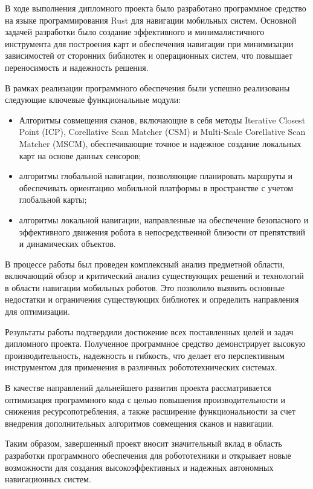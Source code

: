 \label{sec:ending}

В ходе выполнения дипломного проекта было разработано программное средство на
языке программирования Rust для навигации мобильных систем. Основной задачей
разработки было создание эффективного и минималистичного инструмента для
построения карт и обеспечения навигации при минимизации зависимостей от
сторонних библиотек и операционных систем, что повышает переносимость и
надежность решения.

В рамках реализации программного обеспечения были успешно реализованы следующие
ключевые функциональные модули:

\begin{itemize}
	\item Алгоритмы совмещения сканов, включающие в себя методы Iterative
		Closest Point (ICP), Corellative Scan Matcher (CSM) и Multi-Scale
		Corellative Scan Matcher (MSCM), обеспечивающие точное и надежное
		создание локальных карт на основе данных сенсоров;
	\item алгоритмы глобальной навигации, позволяющие планировать маршруты и
		обеспечивать ориентацию мобильной платформы в пространстве с учетом
		глобальной карты;
	\item алгоритмы локальной навигации, направленные на обеспечение
		безопасного и эффективного движения робота в непосредственной близости
		от препятствий и динамических объектов.
\end{itemize}


В процессе работы был проведен комплексный анализ предметной области,
включающий обзор и критический анализ существующих решений и технологий в
области навигации мобильных роботов. Это позволило выявить
основные недостатки и ограничения существующих библиотек и определить
направления для оптимизации.

Результаты работы подтвердили достижение всех поставленных целей и задач
дипломного проекта. Полученное программное средство демонстрирует высокую
производительность, надежность и гибкость, что делает его перспективным
инструментом для применения в различных робототехнических системах.

В качестве направлений дальнейшего развития проекта рассматривается оптимизация
программного кода с целью повышения производительности и снижения
ресурсопотребления, а также расширение функциональности за счет внедрения
дополнительных алгоритмов совмещения сканов и навигации.

Таким образом, завершенный проект вносит значительный вклад в область
разработки программного обеспечения для робототехники и открывает новые
возможности для создания высокоэффективных и надежных автономных навигационных
систем.
